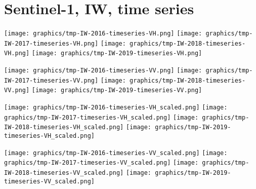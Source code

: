 
\section{Sentinel-1, IW, time series}
\setcounter{theorem}{0}

\renewcommand{\theenumi}{\roman{enumi}}
\renewcommand{\labelenumi}{\textnormal{(\theenumi)}$\;\;$}


\begin{center}
\begin{minipage}{7.0in}
\texttt{[image: graphics/tmp-IW-2016-timeseries-VH.png]}
\quad
\texttt{[image: graphics/tmp-IW-2017-timeseries-VH.png]}
\vskip 1.0cm
\texttt{[image: graphics/tmp-IW-2018-timeseries-VH.png]}
\quad
\texttt{[image: graphics/tmp-IW-2019-timeseries-VH.png]}
\end{minipage}
\end{center}


\begin{center}
\begin{minipage}{7.0in}
\texttt{[image: graphics/tmp-IW-2016-timeseries-VV.png]}
\quad
\texttt{[image: graphics/tmp-IW-2017-timeseries-VV.png]}
\vskip 1.0cm
\texttt{[image: graphics/tmp-IW-2018-timeseries-VV.png]}
\quad
\texttt{[image: graphics/tmp-IW-2019-timeseries-VV.png]}
\end{minipage}
\end{center}


\begin{center}
\begin{minipage}{7.0in}
\texttt{[image: graphics/tmp-IW-2016-timeseries-VH\_scaled.png]}
\quad
\texttt{[image: graphics/tmp-IW-2017-timeseries-VH\_scaled.png]}
\vskip 1.0cm
\texttt{[image: graphics/tmp-IW-2018-timeseries-VH\_scaled.png]}
\quad
\texttt{[image: graphics/tmp-IW-2019-timeseries-VH\_scaled.png]}
\end{minipage}
\end{center}


\begin{center}
\begin{minipage}{7.0in}
\texttt{[image: graphics/tmp-IW-2016-timeseries-VV\_scaled.png]}
\quad
\texttt{[image: graphics/tmp-IW-2017-timeseries-VV\_scaled.png]}
\vskip 1.0cm
\texttt{[image: graphics/tmp-IW-2018-timeseries-VV\_scaled.png]}
\quad
\texttt{[image: graphics/tmp-IW-2019-timeseries-VV\_scaled.png]}
\end{minipage}
\end{center}

